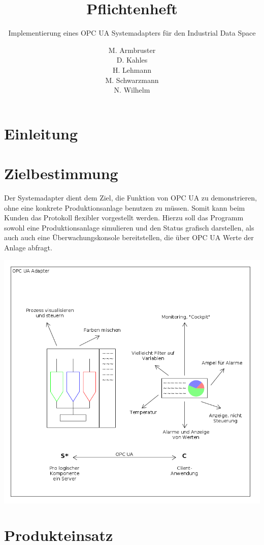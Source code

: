 \documentclass[parskip=full]{scrartcl}
\title{Pflichtenheft}
\subtitle{Implementierung eines OPC UA Systemadapters für den Industrial Data Space}
\author{
    M. Armbruster\\
    D. Kahles\\
    H. Lehmann\\
    M. Schwarzmann\\
    N. Wilhelm
}
\begin{document}
\maketitle
\tableofcontents
\pagebreak

\section{Einleitung}
\Blindtext[1]

\section{Zielbestimmung}
Der Systemadapter dient dem Ziel, die Funktion von OPC UA zu demonstrieren, ohne eine konkrete Produktionsanlage
benutzen zu müssen. Somit kann beim Kunden das Protokoll flexibler vorgestellt werden. Hierzu soll das Programm
sowohl eine Produktionsanlage simulieren und den Status grafisch darstellen, als auch auch eine Überwachungskonsole
bereitstellen, die über OPC UA Werte der Anlage abfragt.\\
\begin{center}
    \includegraphics[scale=0.5]{../system-sketch.png}
\end{center}

\section{Produkteinsatz}
\end{document}
